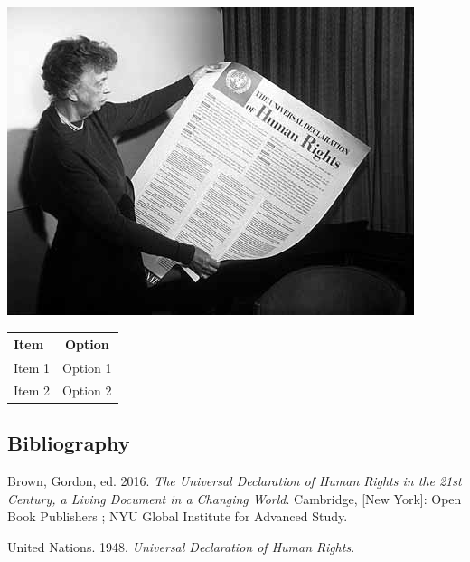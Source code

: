 \documentclass[
]{beamer}
\newlength{\cslhangindent}
\newlength{\cslentryspacingunit} %
\newenvironment{CSLReferences}[2] %
 {%
  \setlength{\parindent}{0pt}
  \ifodd #1
  \let\oldpar\par
  \def\par{\hangindent=\cslhangindent\oldpar}
  \fi
  \setlength{\parskip}{#2\cslentryspacingunit}
 }%
 {}
\begin{document}
\includegraphics[width=\textwidth,height=0.5\textheight]{images/Eleanor_Roosevelt_and_Human_Rights_Declaration.jpeg}

\begin{longtable}[]{@{}lc@{}}
\toprule()
\textbf{Item} & \textbf{Option} \\
\midrule()
\endhead
Item 1 & Option 1 \\
Item 2 & Option 2 \\
\bottomrule()
\end{longtable}

\hypertarget{bibliography}{%
\subsection{Bibliography}\label{bibliography}}

\hypertarget{refs}{}
\begin{CSLReferences}{1}{0}
\leavevmode{}%
Brown, Gordon, ed. 2016. \emph{The {Universal} {Declaration} of {Human}
{Rights} in the 21st Century, a Living Document in a Changing World}.
Cambridge, {[}New York{]}: Open Book Publishers ; NYU Global Institute
for Advanced Study.

\leavevmode{}%
United Nations. 1948. \emph{Universal Declaration of Human Rights}.

\end{CSLReferences}
\end{document}
